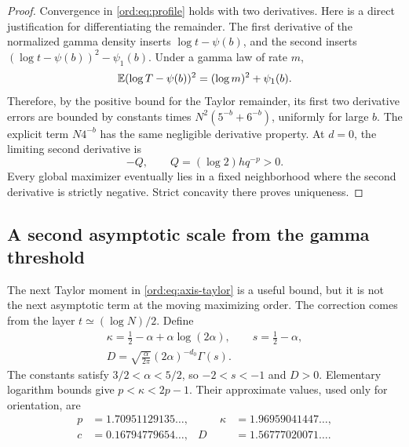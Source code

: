 \begin{proof}
Convergence in \eqref{ord:eq:profile} holds with two derivatives.
Here is a direct justification for differentiating the remainder.
The first derivative of the normalized gamma density inserts
$\log t-\psi(b)$, and the second inserts
$(\log t-\psi(b))^2-\psi_1(b)$. Under a gamma law of rate $m$,
\[
 \mathbb E(\log T-\psi(b))^2=(\log m)^2+\psi_1(b).
\]
Therefore, by the positive bound for the Taylor remainder, its first
two derivative errors are bounded by constants times
$N^2(5^{-b}+6^{-b})$, uniformly for large $b$. The explicit term
$N4^{-b}$ has the same negligible derivative property.
At $d=0$, the limiting second derivative is
\begin{equation}\label{ord:eq:Q-curvature}
 -Q,\qquad Q=(\log2)h q^{-p}>0.
\end{equation}
Every global maximizer eventually lies in a fixed neighborhood where the
second derivative is strictly negative. Strict concavity there proves
uniqueness.
\end{proof}

\subsection{A second asymptotic scale from the gamma threshold}

The next Taylor moment in \eqref{ord:eq:axis-taylor} is a useful bound,
but it is not the next asymptotic term at the moving maximizing order.
The correction comes from the layer $t\simeq(\log N)/2$.
Define
\begin{equation}\label{ord:eq:next-constants}
 \begin{gathered}
 \kappa=\frac12-\alpha+\alpha\log(2\alpha),\qquad
 s=\frac12-\alpha,\\
 D=\sqrt{\frac{\alpha}{2\pi}}(2\alpha)^{-d_0}\Gamma(s).
 \end{gathered}
\end{equation}
The constants satisfy $3/2<\alpha<5/2$, so $-2<s<-1$ and $D>0$.
Elementary logarithm bounds give $p<\kappa<2p-1$. Their approximate
values, used only for orientation, are
\[
 \begin{aligned}
 p&=1.70951129135\ldots,&\qquad
 \kappa&=1.96959041447\ldots,\\
 c&=0.16794779654\ldots,&
 D&=1.56777020071\ldots.
 \end{aligned}
\]

